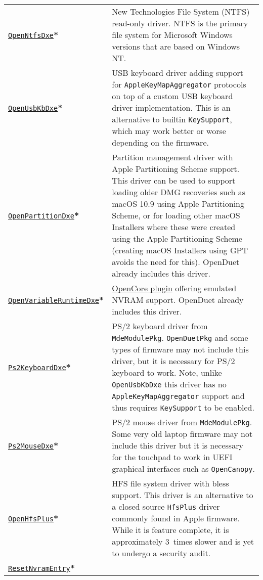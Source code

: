 \documentclass[]{article}
\begin{document}
\begin{longtable}{p{1.65in}p{5.25in}}
\href{https://github.com/acidanthera/OpenCorePkg}{\texttt{OpenNtfsDxe}}\textbf{*}
& New Technologies File System (NTFS) read-only driver.
  NTFS is the primary file system for Microsoft Windows versions that are based on Windows NT. \\
\href{https://github.com/acidanthera/OpenCorePkg}{\texttt{OpenUsbKbDxe}}\textbf{*}
& USB keyboard driver adding support for \texttt{AppleKeyMapAggregator} protocols
  on top of a custom USB keyboard driver implementation. This is an alternative to
  builtin \texttt{KeySupport}, which may work better or worse depending on the firmware. \\
\href{https://github.com/acidanthera/OpenCorePkg}{\texttt{OpenPartitionDxe}}\textbf{*}
& Partition management driver with Apple Partitioning Scheme support.
  This driver can be used to support loading older DMG recoveries such as macOS 10.9
  using Apple Partitioning Scheme, or for loading other macOS Installers where these were
  created using the Apple Partitioning Scheme (creating macOS Installers using GPT avoids
  the need for this). OpenDuet already includes this driver. \\
\href{https://github.com/acidanthera/OpenCorePkg}{\texttt{OpenVariableRuntimeDxe}}\textbf{*}
& \hyperref[emunvram]{OpenCore plugin} offering emulated NVRAM support. OpenDuet already
includes this driver. \\
\href{https://github.com/acidanthera/audk}{\texttt{Ps2KeyboardDxe}}\textbf{*}
& PS/2 keyboard driver from \texttt{MdeModulePkg}. \texttt{OpenDuetPkg} and some types of firmware
  may not include this driver, but it is necessary for PS/2 keyboard to work.
  Note, unlike \texttt{OpenUsbKbDxe} this driver has no \texttt{AppleKeyMapAggregator}
  support and thus requires \texttt{KeySupport} to be enabled. \\
\href{https://github.com/acidanthera/audk}{\texttt{Ps2MouseDxe}}\textbf{*}
& PS/2 mouse driver from \texttt{MdeModulePkg}. Some very old laptop firmware
  may not include this driver but it is necessary for the touchpad to work
  in UEFI graphical interfaces such as \texttt{OpenCanopy}. \\
\href{https://github.com/acidanthera/OpenCorePkg}{\texttt{OpenHfsPlus}}\textbf{*}
& HFS file system driver with bless support. This driver is an alternative to
  a closed source \texttt{HfsPlus} driver commonly found in Apple firmware. While
  it is feature complete, it is approximately 3~times slower and is yet to undergo
  a security audit. \\
\href{https://github.com/acidanthera/OpenCorePkg}{\texttt{ResetNvramEntry}}\textbf{*}

\end{longtable}
\end{document}
